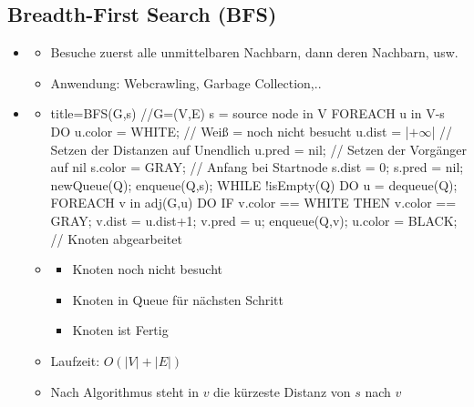 \documentclass[
    12pt,
    a4paper,
    ngerman,
    color=3b,%
    marginpar=false,
    colorback=false,
    leqno,
]{tudaexercise}
\begin{document}
\subsection{Breadth-First Search (BFS)}
    \begin{itemize}
        \item {}
            \begin{itemize}
                \item Besuche zuerst alle unmittelbaren Nachbarn, dann deren Nachbarn, usw.
                \item Anwendung: Webcrawling, Garbage Collection,..
            \end{itemize}
        
        \item {}
            \begin{itemize}
                \item[]
                    \begin{ccode}[autogobble,escapeinside=||]{title={BFS(G,s) //G=(V,E) s = source node in V}}
                    FOREACH u in V-{s} DO
                        u.color = WHITE;        // Weiß = noch nicht besucht
                        u.dist = |$+\infty$|            // Setzen der Distanzen auf Unendlich
                        u.pred = nil;           // Setzen der Vorgänger auf nil
                    s.color = GRAY;             // Anfang bei Startnode
                    s.dist = 0;
                    s.pred = nil;
                    newQueue(Q);
                    enqueue(Q,s);
                    WHILE !isEmpty(Q) DO
                    u = dequeue(Q); 
                    FOREACH v in adj(G,u) DO
                        IF v.color == WHITE THEN
                            v.color == GRAY;
                            v.dist = u.dist+1;
                            v.pred = u;
                            enqueue(Q,v);
                    u.color = BLACK;             // Knoten abgearbeitet
                    \end{ccode}
                \item[] \begin{tcolorbox}[
                    colback=yellow!20,
                    colframe=black!50!red!100,
                    enhanced,
                    title={Farben:}
                ]
                \begin{itemize}
                    \item { Knoten noch nicht besucht}
                    \item { Knoten in Queue für nächsten Schritt}
                    \item { Knoten ist Fertig}
                \end{itemize}
                \end{tcolorbox}
                \item Laufzeit: $O(|V| + |E|)$
                \item Nach Algorithmus steht in $v$ die kürzeste Distanz von $s$ nach $v$
            \end{itemize}


\end{itemize}
\end{document}
